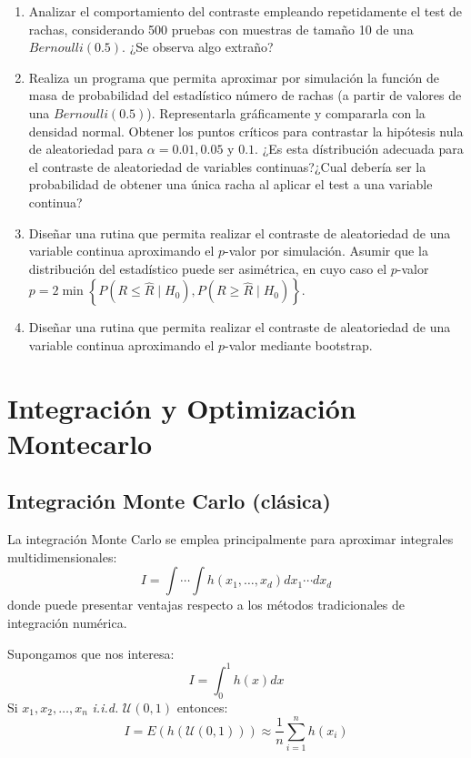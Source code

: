\documentclass[]{book}
\theoremstyle{definition}
\theoremstyle{definition}
\theoremstyle{definition}
\theoremstyle{remark}
\begin{document}
\begin{enumerate}
\def\labelenumi{\alph{enumi})}
\item
  Analizar el comportamiento del contraste empleando repetidamente el
  test de rachas, considerando 500 pruebas con muestras de tamaño 10 de
  una \(Bernoulli(0.5)\). ¿Se observa algo extraño?
\item
  Realiza un programa que permita aproximar por simulación la función de
  masa de probabilidad del estadístico número de rachas (a partir de
  valores de una \(Bernoulli(0.5)\)). Representarla gráficamente y
  compararla con la densidad normal. Obtener los puntos críticos para
  contrastar la hipótesis nula de aleatoriedad para \(\alpha=0.01,0.05\)
  y \(0.1\). ¿Es esta dístribución adecuada para el contraste de
  aleatoriedad de variables continuas?¿Cual debería ser la probabilidad
  de obtener una única racha al aplicar el test a una variable continua?
\item
  Diseñar una rutina que permita realizar el contraste de aleatoriedad
  de una variable continua aproximando el \(p\)-valor por simulación.
  Asumir que la distribución del estadístico puede ser asimétrica, en
  cuyo caso el \(p\)-valor
  \(p=2\min\left\{ P\left( R\leq\hat{R}\mid H_{0}\right) , P\left( R\geq \hat{R}\mid H_{0}\right) \right\}\).
\item
  Diseñar una rutina que permita realizar el contraste de aleatoriedad
  de una variable continua aproximando el \(p\)-valor mediante
  bootstrap.
\end{enumerate}

\chapter{Integración y Optimización
Montecarlo}\label{integracion-y-optimizacion-montecarlo}

\section{Integración Monte Carlo
(clásica)}\label{integracion-monte-carlo-clasica}

La integración Monte Carlo se emplea principalmente para aproximar
integrales multidimensionales:
\[I = \int \cdots \int h\left( x_{1},\ldots ,x_{d}\right) 
dx_{1}\cdots dx_{d}\] donde puede presentar ventajas respecto a los
métodos tradicionales de integración numérica.

Supongamos que nos interesa: \[I = \int_{0}^{1}h\left( x\right) dx\] Si
\(x_{1},x_{2},\ldots ,x_{n}\) \emph{i.i.d.}
\(\mathcal{U}\left( 0,1\right)\) entonces:
\[I = E\left( h\left( \mathcal{U}\left( 0,1\right) \right) \right)
\approx \frac{1}{n}\sum\limits_{i=1}^{n}h\left( x_{i}\right)\]
\end{document}
